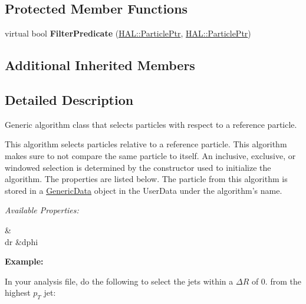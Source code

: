 \subsection*{Protected Member Functions}
\begin{DoxyCompactItemize}
\item 
\hypertarget{class_h_a_l_1_1_algorithms_1_1_select_ref_particle_a04fa4b96a01e34c5ee0bb8782eb51b00}{virtual bool {\bfseries Filter\-Predicate} (\hyperlink{class_h_a_l_1_1_generic_particle}{H\-A\-L\-::\-Particle\-Ptr}, \hyperlink{class_h_a_l_1_1_generic_particle}{H\-A\-L\-::\-Particle\-Ptr})}\label{class_h_a_l_1_1_algorithms_1_1_select_ref_particle_a04fa4b96a01e34c5ee0bb8782eb51b00}

\end{DoxyCompactItemize}
\subsection*{Additional Inherited Members}


\subsection{Detailed Description}
Generic algorithm class that selects particles with respect to a reference particle. 

This algorithm selects particles relative to a reference particle. This algorithm makes sure to not compare the same particle to itself. An inclusive, exclusive, or windowed selection is determined by the constructor used to initialize the algorithm. The properties are listed below. The particle from this algorithm is stored in a \hyperlink{class_h_a_l_1_1_generic_data}{Generic\-Data} object in the User\-Data under the algorithm's name.\par
\par
 {\itshape Available Properties\-:} \begin{TabularC}{2}
\hline
{}\PBS{}&\PBS\centering {\bf $ \Delta\phi $ }\\
\PBS\centering dr &\PBS\centering dphi \\
\end{TabularC}
{\bfseries Example\-:}\par
 In your analysis file, do the following to select the jets within a $ \Delta R $ of 0. from the highest $ p_T $ jet\-:


